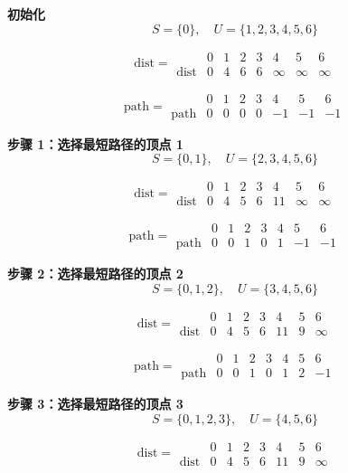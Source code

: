 \documentclass[lang=cn,newtx,10pt,scheme=chinese]{elegantbook}
\begin{document}
\textbf{初始化}
\[
S = \{0\}, \quad U = \{1, 2, 3, 4, 5, 6\}
\]

\[
\text{dist} =
\begin{array}{c|ccccccc}
 & 0 & 1 & 2 & 3 & 4 & 5 & 6 \\ \hline
\text{dist} & 0 & 4 & 6 & 6 & \infty & \infty & \infty 
\end{array}
\]

\[
\text{path} =
\begin{array}{c|ccccccc}
 & 0 & 1 & 2 & 3 & 4 & 5 & 6 \\ \hline
\text{path} & 0 & 0 & 0 & 0 & -1 & -1 & -1
\end{array}
\]

\textbf{步骤 1：选择最短路径的顶点 1}
\[
S = \{0,1\}, \quad U = \{2, 3, 4, 5, 6\}
\]

\[
\text{dist} =
\begin{array}{c|ccccccc}
 & 0 & 1 & 2 & 3 & 4 & 5 & 6 \\ \hline
\text{dist} & 0 & 4 & 5 & 6 & 11 & \infty & \infty 
\end{array}
\]

\[
\text{path} =
\begin{array}{c|ccccccc}
 & 0 & 1 & 2 & 3 & 4 & 5 & 6 \\ \hline
\text{path} & 0 & 0 & 1 & 0 & 1 & -1 & -1
\end{array}
\]

\textbf{步骤 2：选择最短路径的顶点 2}
\[
S = \{0,1,2\}, \quad U = \{3, 4, 5, 6\}
\]

\[
\text{dist} =
\begin{array}{c|ccccccc}
 & 0 & 1 & 2 & 3 & 4 & 5 & 6 \\ \hline
\text{dist} & 0 & 4 & 5 & 6 & 11 & 9 & \infty
\end{array}
\]

\[
\text{path} =
\begin{array}{c|ccccccc}
 & 0 & 1 & 2 & 3 & 4 & 5 & 6 \\ \hline
\text{path} & 0 & 0 & 1 & 0 & 1 & 2 & -1
\end{array}
\]

\textbf{步骤 3：选择最短路径的顶点 3}
\[
S = \{0,1,2,3\}, \quad U = \{4, 5, 6\}
\]

\[
\text{dist} =
\begin{array}{c|ccccccc}
 & 0 & 1 & 2 & 3 & 4 & 5 & 6 \\ \hline
\text{dist} & 0 & 4 & 5 & 6 & 11 & 9 & \infty
\end{array}
\]
\end{document}
